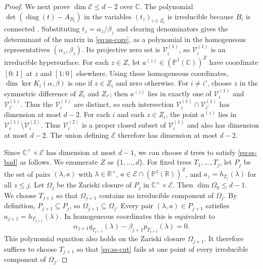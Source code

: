 \documentclass[11pt,a4paper]{article}
\theoremstyle{plain}
\theoremstyle{definition}
\DeclareMathOperator{\diag}{diag}
\newcommand{\R}{\mathbb{R}}
\begin{document}
\begin{proof}
We next prove $\dim\mathcal E\le d-2$ over $\mathbb C$.
The polynomial $\det(\diag(t)-A_{B_i})$ in the variables $(t_z)_{z\in Z_i}$
is irreducible because $B_i$ is connected
\cite[Lemma~4.1]{AlAhmadieh2026}.
Substituting $t_z=\alpha_z/\beta_z$ and clearing denominators gives the
determinant of the matrix in \cref{eq:ss-core}, as a polynomial in the
homogeneous representatives $(\alpha_z,\beta_z)$.
Its projective zero set is $\mathcal V_i^{(1)}$, so
$\mathcal V_i^{(1)}$ is an irreducible hypersurface.
For each $z\in Z$, let $a^{(z)}\in(\mathbb P^1(\mathbb C))^Z$ have
coordinate $[0:1]$ at $z$ and $[1:0]$ elsewhere.
Using these homogeneous coordinates, $\dim\ker K_i(\alpha,\beta)$ is one
if $z\in Z_i$ and zero otherwise.
For $i\ne i'$, choose $z$ in the symmetric difference of $Z_i$ and
$Z_{i'}$; then $a^{(z)}$ lies in exactly one of $\mathcal V_i^{(1)}$ and
$\mathcal V_{i'}^{(1)}$.
Thus the $\mathcal V_i^{(1)}$ are distinct, so each intersection
$\mathcal V_i^{(1)}\cap \mathcal V_{i'}^{(1)}$ has dimension at most $d-2$.
For each $i$ and each $z\in Z_i$, the point $a^{(z)}$ lies in
$\mathcal V_i^{(1)}\setminus\mathcal V_i^{(2)}$.
Thus $\mathcal V_i^{(2)}$ is a proper closed subset of
$\mathcal V_i^{(1)}$ and also has dimension at most $d-2$.
The union defining $\mathcal E$ therefore has dimension at most $d-2$.

Since $\mathbb C^\times\times\mathcal E$ has dimension at most $d-1$,
we can choose $d$ trees to satisfy \cref{eq:ss-bad} as follows.
We enumerate $Z$ as $\{1,\ldots,d\}$.
For fixed trees $T_1,\ldots,T_j$, let $P_j$ be the set of pairs
$(\lambda,a)$ with $\lambda\in\R^\times$,
$a\in\mathcal E\cap(\mathbb P^1(\R))^Z$, and
$a_z=h_{T_z}(\lambda)$ for all $z\le j$.
Let $\Omega_j$ be the Zariski closure of $P_j$ in
$\mathbb C^\times\times\mathcal E$.
Then $\dim\Omega_0\le d-1$.
We choose $T_{j+1}$ so that $\Omega_{j+1}$ contains no irreducible
component of $\Omega_j$.
By definition, $P_{j+1}\subseteq P_j$, so $\Omega_{j+1}\subseteq\Omega_j$.
Every pair $(\lambda,a)\in P_{j+1}$ satisfies
$a_{j+1}=h_{T_{j+1}}(\lambda)$. In homogeneous coordinates this is
equivalent to
\begin{equation}\label{eq:ss-cut}
 \alpha_{j+1}q_{T_{j+1}}(\lambda)-\beta_{j+1}p_{T_{j+1}}(\lambda)=0.
\end{equation}
This polynomial equation also holds on the Zariski closure
$\Omega_{j+1}$.
It therefore suffices to choose $T_{j+1}$ so that \cref{eq:ss-cut}
fails at one point of every irreducible component of $\Omega_j$.


\end{proof}
\end{document}
